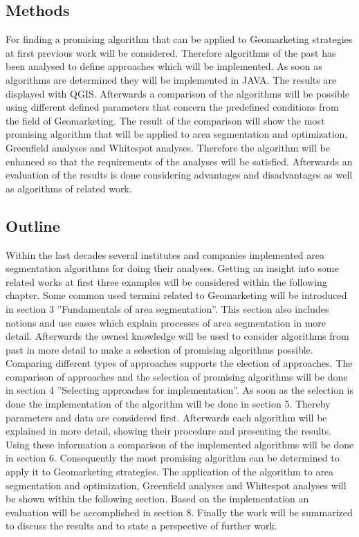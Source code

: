 \subsection{Methods}
For finding a promising algorithm that can be applied to Geomarketing strategies at first previous work will be considered. Therefore algorithms of the past has been analysed to define approaches which will be implemented. As soon as algorithms are determined they will be implemented in JAVA. The results are displayed with QGIS. Afterwards a comparison of the algorithms will be possible using different defined parameters that concern the predefined conditions from the field of Geomarketing. The result of the comparison will show the most promising algorithm that will be applied to area segmentation and optimization, Greenfield analyses and Whitespot analyses. Therefore the algorithm will be enhanced so that the requirements of the analyses will be satisfied. Afterwards an evaluation of the results is done considering advantages and disadvantages as well as algorithms of related work. 

\subsection{Outline}
Within the last decades several institutes and companies implemented area segmentation algorithms for doing their analyses. Getting an insight into some related works at first three examples will be considered within the following chapter. Some common used termini related to Geomarketing will be introduced in section 3 ''Fundamentals of area segmentation''. This section also includes notions and use cases which explain processes of area segmentation in more detail. Afterwards the owned knowledge will be used to consider algorithms from past in more detail to make a selection of promising algorithms possible. Comparing different types of approaches supports the election of approaches. The comparison of approaches and the selection of promising algorithms will be done in section 4 ''Selecting approaches for implementation''. As soon as the selection is done the implementation of the algorithm will be done in section 5. Thereby parameters and data are considered first. Afterwards each algorithm will be explained in more detail, showing their procedure and presenting the results. Using these information a comparison of the implemented algorithms will be done in section 6. Consequently the most promising algorithm can be determined to apply it to Geomarketing strategies. The application of the algorithm to area segmentation and optimization, Greenfield analyses and Whitespot analyses will be shown within the following section. Based on the implementation an evaluation will be accomplished in section 8. Finally the work will be summarized to discuss the results and to state a perspective of further work.